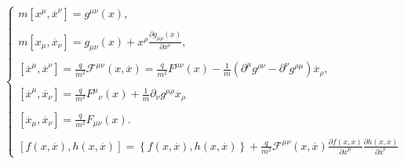 \begin{equation}
\left\{ 
\begin{array}{l}
m\left[ x^{\mu },\stackrel{.}{x}^{\nu }\right] =g^{\mu \nu }(x), \\ 
\\ 
m\left[ x_{\mu },\stackrel{.}{x}_{\nu }\right] =g_{\mu \nu }(x)+x^{\rho }%
\frac{\partial g_{\mu \rho }(x)}{\partial x^{\nu }}, \\ 
\\ 
\left[ \stackrel{.}{x}^{\mu },\stackrel{.}{x}^{\nu }\right] =\frac{q}{m^{2}}%
\mathcal{F}^{\mu \nu }(x,\stackrel{.}{x})=\frac{q}{m^{2}}F^{\mu \nu }(x)-%
\frac{1}{m}(\partial ^{\mu }g^{\rho \nu }-\partial ^{\nu }g^{\rho
\mu })\stackrel{.}{x}_{\rho }, \\ 
\\ 
\left[ \stackrel{.}{x}^{\mu },\stackrel{.}{x}_{\nu }\right] =\frac{q}{m^{2}}%
F^{\mu }{}_{\nu }(x)+\frac{1}{m}\partial _{\nu }g^{\mu \rho }\stackrel{.}{x}%
_{\rho } \\ 
\\ 
\left[ \stackrel{.}{x}_{\mu },\stackrel{.}{x}_{\nu }\right] =\frac{q}{m^{2}}%
F_{\mu \nu }(x). \\ 
\\ 
\left[ f(x,\stackrel{.}{x}),h(x,\stackrel{.}{x})\right] =\left\{ f(x,%
\stackrel{.}{x}),h(x,\stackrel{.}{x})\right\} +\frac{q}{m^{2}}\mathcal{F}%
^{\mu \nu }(x,\stackrel{.}{x})\frac{\partial f(x,\stackrel{.}{x})}{\partial 
\stackrel{.}{x}^{\mu }}\frac{\partial h(x,\stackrel{.}{x})}{\partial 
\stackrel{.}{x}^{\nu }}
\end{array}
\right.
\end{equation}

